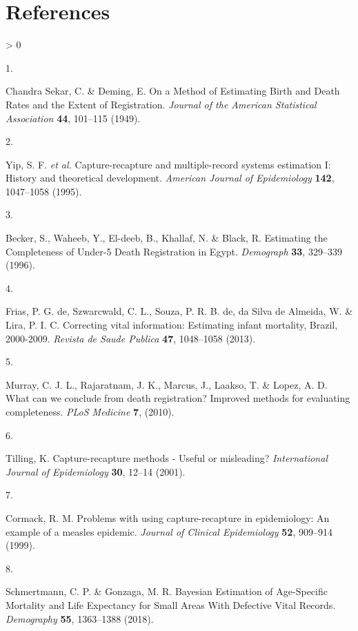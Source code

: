 \documentclass[
]{article}
\newlength{\cslhangindent}
\newlength{\csllabelwidth}
\newenvironment{CSLReferences}[2] %
 {%
  \setlength{\parindent}{0pt}
  \ifodd #1 \everypar{\setlength{\hangindent}{\cslhangindent}}\ignorespaces\fi
  \ifnum #2 > 0
  \setlength{\parskip}{#2\baselineskip}
  \fi
 }%
 {}
\newcommand{\CSLLeftMargin}[1]{\parbox[t]{\csllabelwidth}{#1}}
\newcommand{\CSLRightInline}[1]{\parbox[t]{\linewidth - \csllabelwidth}{#1}\break}
\begin{document}
\hypertarget{references}{%
\section{References}\label{references}}

\hypertarget{refs}{}
\begin{CSLReferences}{0}{0}
\leavevmode\hypertarget{ref-ChandraSekar1949}{}%
\CSLLeftMargin{1. }
\CSLRightInline{Chandra Sekar, C. \& Deming, E. {On a Method of Estimating Birth and Death Rates and the Extent of Registration}. \emph{Journal of the American Statistical Association} \textbf{44}, 101--115 (1949).}

\leavevmode\hypertarget{ref-Yip1995}{}%
\CSLLeftMargin{2. }
\CSLRightInline{Yip, S. F. \emph{et al.} {Capture-recapture and multiple-record systems estimation I: History and theoretical development}. \emph{American Journal of Epidemiology} \textbf{142}, 1047--1058 (1995).}

\leavevmode\hypertarget{ref-Becker1996}{}%
\CSLLeftMargin{3. }
\CSLRightInline{Becker, S., Waheeb, Y., El-deeb, B., Khallaf, N. \& Black, R. {Estimating the Completeness of Under-5 Death Registration in Egypt}. \emph{Demograph} \textbf{33}, 329--339 (1996).}

\leavevmode\hypertarget{ref-DeFrias2013}{}%
\CSLLeftMargin{4. }
\CSLRightInline{Frias, P. G. de, Szwarcwald, C. L., Souza, P. R. B. de, da Silva de Almeida, W. \& Lira, P. I. C. {Correcting vital information: Estimating infant mortality, Brazil, 2000-2009}. \emph{Revista de Saude Publica} \textbf{47}, 1048--1058 (2013).}

\leavevmode\hypertarget{ref-Murray2010}{}%
\CSLLeftMargin{5. }
\CSLRightInline{Murray, C. J. L., Rajaratnam, J. K., Marcus, J., Laakso, T. \& Lopez, A. D. {What can we conclude from death registration? Improved methods for evaluating completeness}. \emph{PLoS Medicine} \textbf{7}, (2010).}

\leavevmode\hypertarget{ref-Tilling2001}{}%
\CSLLeftMargin{6. }
\CSLRightInline{Tilling, K. {Capture-recapture methods - Useful or misleading?} \emph{International Journal of Epidemiology} \textbf{30}, 12--14 (2001).}

\leavevmode\hypertarget{ref-Cormack1999}{}%
\CSLLeftMargin{7. }
\CSLRightInline{Cormack, R. M. {Problems with using capture-recapture in epidemiology: An example of a measles epidemic}. \emph{Journal of Clinical Epidemiology} \textbf{52}, 909--914 (1999).}

\leavevmode\hypertarget{ref-Schmertmann2018a}{}%
\CSLLeftMargin{8. }
\CSLRightInline{Schmertmann, C. P. \& Gonzaga, M. R. {Bayesian Estimation of Age-Specific Mortality and Life Expectancy for Small Areas With Defective Vital Records}. \emph{Demography} \textbf{55}, 1363--1388 (2018).}


\end{CSLReferences}
\end{document}
